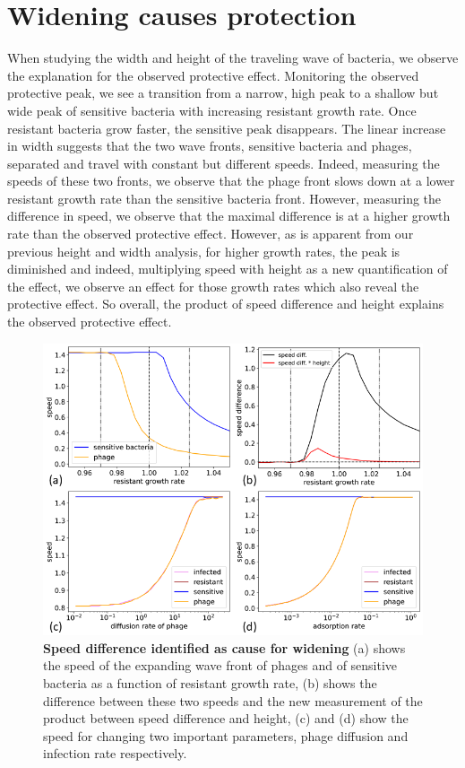 \section{Widening causes protection}
When studying the width and height of the traveling wave of bacteria, we observe the explanation for the observed protective effect. Monitoring the observed protective peak, we see a transition from a narrow, high peak to a shallow but wide peak of sensitive bacteria with increasing resistant growth rate. Once resistant bacteria grow faster, the sensitive peak disappears. The linear increase in width suggests that the two wave fronts, sensitive bacteria and phages, separated and travel with constant but different speeds. Indeed, measuring the speeds of these two fronts, we observe that the phage front slows down at a lower resistant growth rate than the sensitive bacteria front. However, measuring the difference in speed, we observe that the maximal difference is at a higher growth rate than the observed protective effect. However, as is apparent from our previous height and width analysis, for higher growth rates, the peak is diminished and indeed, multiplying speed with height as a new quantification of the effect, we observe an effect for those growth rates which also reveal the protective effect. So overall, the product of speed difference and height explains the observed protective effect. 
\begin{figure}
\centering
\includegraphics[width=\linewidth]{graphics/2025_09_26_droplets_fig4.png}
\caption{\textbf{Speed difference identified as cause for widening} (a) shows the speed of the expanding wave front of phages and of sensitive bacteria as a function of resistant growth rate, (b) shows the difference between these two speeds and the new measurement of the product between speed difference and height, (c) and (d) show the speed for changing two important parameters, phage diffusion and infection rate respectively.}
\label{fig:results_speed_height}
\end{figure}

